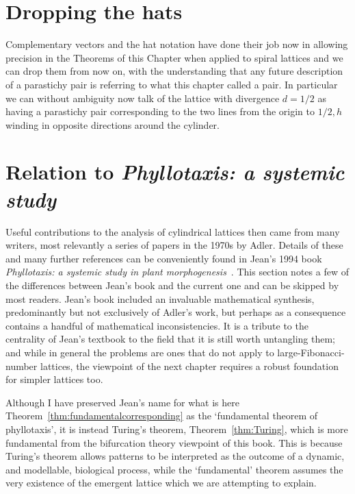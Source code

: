  \section{Dropping the hats}
 Complementary vectors and the hat notation have done their job now in allowing precision in  the Theorems of this Chapter when applied to spiral lattices and we can drop them from now on, with the understanding that any future description of a  parastichy pair is referring to what this chapter called a  pair. In particular we can  without ambiguity now talk of the lattice with divergence $d=1/2$ as having a   parastichy pair corresponding to the two lines from the origin to ${1/2,h}$ winding in opposite directions around the cylinder. 
 
 
\section{Relation to \textit{Phyllotaxis: a systemic study}}
Useful contributions to the analysis of cylindrical lattices then came from many writers, most relevantly a series of papers in the 1970s by Adler. Details of these and many further references can be conveniently found in Jean's 1994 book \textit{Phyllotaxis: a systemic study in plant morphogenesis}~\cite{jeanPhyllotaxisSystemicStudy1994}.
This section notes a few of the differences between Jean's book and the current one and can be skipped by most readers.
Jean's book included an invaluable mathematical synthesis, predominantly but not exclusively of Adler's work, but perhaps as a consequence contains a handful of mathematical inconsistencies. It is a tribute to the centrality of Jean's textbook to the field that it is still worth untangling them; and while in general the problems are ones that do not apply to large-Fibonacci-number lattices, the viewpoint of the next chapter requires a robust foundation for simpler lattices too. 

Although I have preserved Jean's name for what is here Theorem~\ref{thm:fundamentalcorresponding} as the `fundamental theorem of phyllotaxis', it is instead Turing's theorem, Theorem~\ref{thm:Turing}, which is more fundamental from the bifurcation theory viewpoint of this book. This is because Turing's theorem allows patterns to be interpreted as the outcome of a dynamic, and modellable, biological process, while the `fundamental' theorem assumes the very existence of the emergent lattice which we are attempting to explain. 

